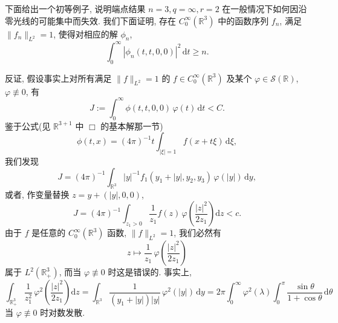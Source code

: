 \begin{remark}\label{rem:c8-0.35}
下面给出一个初等例子, 说明端点结果 $n=3, q=\infty, r=2$ 在一般情况下如何因沿零光线的可能集中而失效. 我们下面证明, 存在 $C_0^\infty(\mathbb{R}^3)$ 中的函数序列 $f_n$, 满足 $\|f_n\|_{L^2}=1$, 使得对相应的解 $\phi_n$, 
\begin{equation}
\int_0^\infty|\phi_n(t, t, 0, 0)|^2\, \mathrm{d}t\geq n.\label{eq:c8-335}
\end{equation}

反证, 假设事实上对所有满足 $\|f\|_{L^2}=1$ 的 $f\in C_0^\infty(\mathbb{R}^3)$ 及某个 $\varphi\in\mathcal{S}(\mathbb{R})$, $\varphi\not\equiv0$, 有
\[
J:=\int_0^\infty\phi(t, t, 0, 0)\, \varphi(t)\, \mathrm{d}t<C .
\]
鉴于公式(见 $\mathbb{R}^{3+1}$ 中 $\Box$ 的基本解那一节)
\[
\phi(t, x)=(4\pi)^{-1}t\int_{|\xi|=1}f(x+t\xi)\, \mathrm{d}\xi, 
\]
我们发现
\[
J=(4\pi)^{-1}\int_{\mathbb{R}^3}|y|^{-1}f_1(y_1+|y|, y_2, y_3)\, \varphi(|y|)\, \mathrm{d}y, 
\]
或者, 作变量替换 $z=y+(|y|, 0, 0)$, 
\[
J=(4\pi)^{-1}\int_{z_1>0}\frac{1}{z_1}f(z)\, \varphi\!\left(\frac{|z|^2}{2z_1}\right)\mathrm{d}z<c .
\]
由于 $f$ 是任意的 $C_0^\infty(\mathbb{R}^3)$ 函数, $\|f\|_{L^2}=1$, 我们必然有
\[
z\mapsto\frac{1}{z_1}\, \varphi\!\left(\frac{|z|^2}{2z_1}\right)
\]
属于 $L^2(\mathbb{R}_+^3)$, 而当 $\varphi\not\equiv0$ 时这是错误的. 事实上, 
\[
\int_{\mathbb{R}_+^3}\frac{1}{z_1^2}\, \varphi^2\!\left(\frac{|z|^2}{2z_1}\right)\mathrm{d}z
=\int_{\mathbb{R}^3}\frac{1}{(y_1+|y|)|y|}\, \varphi^2(|y|)\, \mathrm{d}y
=2\pi\int_0^\infty\varphi^2(\lambda)\int_0^\pi\frac{\sin\theta}{1+\cos\theta}\, \mathrm{d}\theta
\]
当 $\varphi\not\equiv0$ 时对数发散. 
\end{remark}

